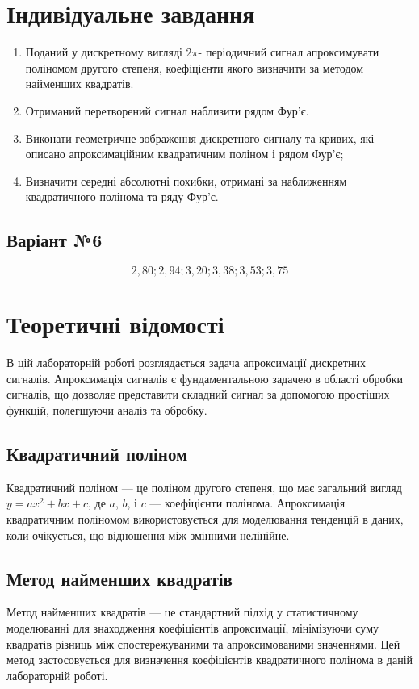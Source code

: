 \documentclass[oneside,14pt]{extarticle}
\begin{document}
\begin{normalsize}
	\section*{Індивідуальне завдання}
	\begin{enumerate}
		\item Поданий у дискретному вигляді $2\pi$- періодичний сигнал
апроксимувати поліномом другого степеня, коефіцієнти якого визначити за
методом найменших квадратів.
		\item Отриманий перетворений сигнал наблизити рядом Фур’є.
		\item Виконати геометричне зображення дискретного сигналу та кривих,
які описано апроксимаційним квадратичним поліном і рядом Фур’є;
		\item Визначити середні абсолютні похибки, отримані за наближенням
квадратичного полінома та ряду Фур’є.
	\end{enumerate}
	
	\subsection*{Варіант №6}
	
	\begin{equation}
		2,80; 2,94; 3,20; 3,38; 3,53; 3,75\nonumber
	\end{equation}
	
	\section*{Теоретичні відомості}

В цій лабораторній роботі розглядається задача апроксимації дискретних сигналів. Апроксимація сигналів є фундаментальною задачею в області обробки сигналів, що дозволяє представити складний сигнал за допомогою простіших функцій, полегшуючи аналіз та обробку.

\subsection*{Квадратичний поліном}
Квадратичний поліном — це поліном другого степеня, що має загальний вигляд \(y = ax^2 + bx + c\), де \(a\), \(b\), і \(c\) — коефіцієнти полінома. Апроксимація квадратичним поліномом використовується для моделювання тенденцій в даних, коли очікується, що відношення між змінними нелінійне.

\subsection*{Метод найменших квадратів}
Метод найменших квадратів — це стандартний підхід у статистичному моделюванні для знаходження коефіцієнтів апроксимації, мінімізуючи суму квадратів різниць між спостережуваними та апроксимованими значеннями. Цей метод застосовується для визначення коефіцієнтів квадратичного полінома в даній лабораторній роботі.


\end{normalsize}
\end{document}

